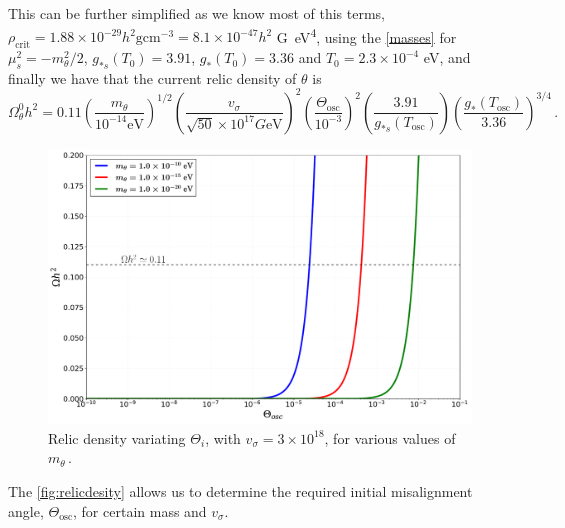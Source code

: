 This can be further simplified as we know most of this terms,  $\rho_\textrm{crit}=1.88\times 10^{-29}h^2 \si{\g\cm^{-3}}=8.1\times10^{-47}h^2$ \si{G\eV^4}, using the \autoref{masses} for $\mu_s^2=-m_\theta^2/2$, $g_{*s}(T_0)=3.91$, $g_*(T_0)=3.36$ and $T_0=2.3\times10^{-4}$ \si{\eV}, and finally we have that the current relic density of $\theta$ is
\begin{equation}
    \Omega^0_\theta h^2=0.11\left(\dfrac{m_\theta}{10^{-14}\si{\eV}}\right)^{1/2}\left(\dfrac{v_\sigma}{\sqrt{50}\times10^{17}\si{G\eV}}\right)^{2}\left(\dfrac{\Theta_\textrm{osc}}{10^{-3}}\right)^{2}\left(\dfrac{3.91}{g_{*s}(T_\textrm{osc})}\right)\left(\dfrac{g_*(T_\textrm{osc})}{3.36}\right)^{3/4}\,.
\end{equation}
 
\begin{figure}[H]
	\centering
	\includegraphics[width=0.9\linewidth]{graphs/relic_density.pdf}
	\caption{Relic density variating $\Theta_i$, with $v_\sigma=3\times 10^{18}$, for various values of $m_\theta$\,.}
	\label{fig:relicdesity}
\end{figure}

The \autoref{fig:relicdesity} allows us to determine the required initial misalignment angle, $\Theta_\textrm{osc}$, for certain mass and $v_\sigma$.
